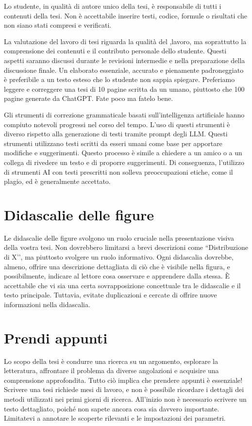 \documentclass{article}
\newcounter{nota}
\begin{document}
\begin{nota}
Lo studente, in qualità di autore unico della tesi, è responsabile di tutti i contenuti della tesi. Non è accettabile inserire testi, codice, formule o risultati che non siano stati compresi e verificati.
\end{nota}

La valutazione del lavoro di tesi riguarda la qualità del ,lavoro, ma soprattutto la comprensione dei contenuti e il contributo personale dello studente. Questi aspetti saranno discussi durante le revisioni intermedie e nella preparazione della discussione finale. Un elaborato essenziale, accurato e pienamente padroneggiato è preferibile a un testo esteso che lo studente non sappia spiegare. Preferiamo leggere e correggere una tesi di 10 pagine scritta da un umano, piuttosto che 100 pagine generate da ChatGPT. Fate poco ma fatelo bene.

Gli strumenti di correzione grammaticale basati sull'intelligenza artificiale hanno compiuto notevoli progressi nel corso del tempo. L’uso di questi strumenti è diverso rispetto alla generazione di testi tramite prompt degli LLM. Questi strumenti utilizzano testi scritti da esseri umani come base per apportare modifiche e suggerimenti. Questo processo è simile a chiedere a un amico o a un collega di rivedere un testo e di proporre suggerimenti. Di conseguenza, l’utilizzo di strumenti AI con testi prescritti non solleva preoccupazioni etiche, come il plagio, ed è generalmente accettato.

\section{Didascalie delle figure}
Le didascalie delle figure svolgono un ruolo cruciale nella presentazione visiva della vostra tesi. Non dovrebbero limitarsi a brevi descrizioni come ``Distribuzione di X’', ma piuttosto svolgere un ruolo informativo. Ogni didascalia dovrebbe, almeno, offrire una descrizione dettagliata di ciò che è visibile nella figura, e possibilmente, indicare al lettore cosa osservare e apprendere dalla stessa. È accettabile che vi sia una certa sovrapposizione concettuale tra le didascalie e il testo principale. Tuttavia, evitate duplicazioni e cercate di offrire nuove informazioni nella didascalia.

\section{Prendi appunti}
Lo scopo della tesi è condurre una ricerca su un argomento, esplorare la letteratura, affrontare il problema da diverse angolazioni e acquisire una comprensione approfondita. Tutto ciò implica che prendere appunti è essenziale! Scrivere una tesi richiede mesi di lavoro, e non è possibile ricordare i dettagli dei metodi utilizzati nei primi giorni di ricerca. All’inizio non è necessario scrivere un testo dettagliato, poiché non sapete ancora cosa sia davvero importante. Limitatevi a annotare le scoperte rilevanti e le impostazioni dei parametri.
\end{document}
